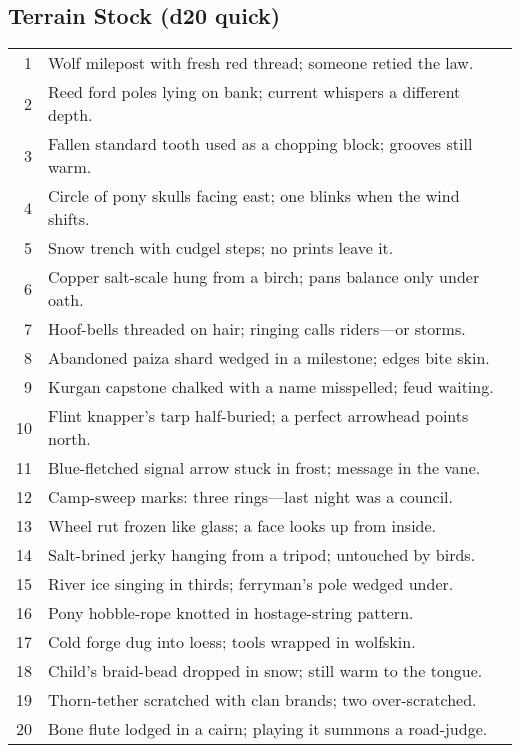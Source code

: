 \subsection*{Terrain Stock (d20 quick)}
\begin{tabular}{r l}
1 & Wolf milepost with fresh red thread; someone retied the law. \\
2 & Reed ford poles lying on bank; current whispers a different depth. \\
3 & Fallen standard tooth used as a chopping block; grooves still warm. \\
4 & Circle of pony skulls facing east; one blinks when the wind shifts. \\
5 & Snow trench with cudgel steps; no prints leave it. \\
6 & Copper salt-scale hung from a birch; pans balance only under oath. \\
7 & Hoof-bells threaded on hair; ringing calls riders—or storms. \\
8 & Abandoned paiza shard wedged in a milestone; edges bite skin. \\
9 & Kurgan capstone chalked with a name misspelled; feud waiting. \\
10 & Flint knapper’s tarp half-buried; a perfect arrowhead points north. \\
11 & Blue-fletched signal arrow stuck in frost; message in the vane. \\
12 & Camp-sweep marks: three rings—last night was a council. \\
13 & Wheel rut frozen like glass; a face looks up from inside. \\
14 & Salt-brined jerky hanging from a tripod; untouched by birds. \\
15 & River ice singing in thirds; ferryman’s pole wedged under. \\
16 & Pony hobble-rope knotted in hostage-string pattern. \\
17 & Cold forge dug into loess; tools wrapped in wolfskin. \\
18 & Child’s braid-bead dropped in snow; still warm to the tongue. \\
19 & Thorn-tether scratched with clan brands; two over-scratched. \\
20 & Bone flute lodged in a cairn; playing it summons a road-judge. \\
\end{tabular}

